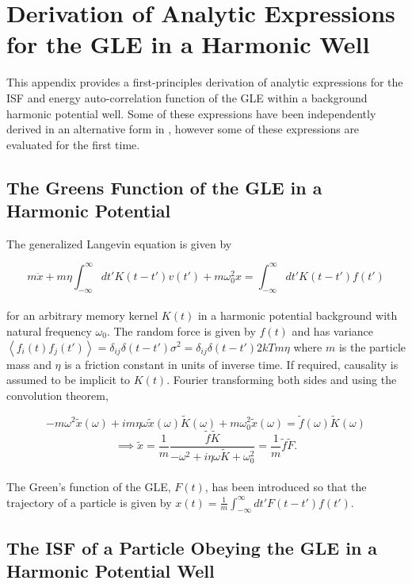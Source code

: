\appendix

\chapter{Derivation of Analytic Expressions for the GLE in a Harmonic Well} \label{apx:analytic_gle_appendix}

This appendix provides a first-principles derivation of analytic expressions for the ISF and energy auto-correlation function of the GLE within a background harmonic potential well. Some of these expressions have been independently derived in an alternative form in \cite{Townsend_2018}, however some of these expressions are evaluated for the first time. 

\section{The Greens Function of the GLE in a Harmonic Potential}

The generalized Langevin equation is given by

$$
m\ddot{x} + m\eta \int_{-\infty}^{\infty} dt' K(t - t')v(t') + m\omega_0^2 x = \int_{-\infty}^{\infty} dt' K(t - t')f(t')
$$
\\
for an arbitrary memory kernel $K(t)$ in a harmonic potential background with natural frequency $\omega_0$. The random force is given by $f(t)$ and has variance $\left<f_i(t)f_j(t')\right>=\delta_{ij}\delta(t-t')\sigma^2 = \delta_{ij}\delta(t-t')2kTm\eta$ where $m$ is the particle mass and $\eta$ is a friction constant in units of inverse time. If required, causality is assumed to be implicit to $K(t)$. Fourier transforming both sides and using the convolution theorem,

$$
-m\omega^2 \tilde{x}(\omega) + i m \eta \omega \tilde{x}(\omega) \tilde{K}(\omega) + m\omega_0^2 \tilde{x}(\omega) = \tilde{f}(\omega) \tilde{K}(\omega)
$$
$$
\implies \tilde{x} = \frac{1}{m} \frac{\tilde{f} \tilde{K}}{-\omega^2 + i \eta \omega \tilde{K} + \omega_0^2} = \frac{1}{m} \tilde{f} \tilde{F}.
$$
\\
The Green's function of the GLE, $F(t)$, has been introduced so that the trajectory of a particle is given by $x(t) = \frac{1}{m}\int_{-\infty}^{\infty}dt'F(t-t')f(t')$.

\section{The ISF of a Particle Obeying the GLE in a Harmonic Potential Well \label{isf_gle_well}}
\label{ch:gle_derivation}

